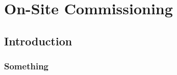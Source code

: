 \chapter{On-Site Commissioning}
\label{chap:commissioning}
\chaptoc{}


\newpage
\section{Introduction}
\label{sec:commissioning_intro}
\begin{colsection}


\begin{colsection}


\end{colsection}

\subsection{Something}
\label{sec:something}
\begin{colsection}


\end{colsection}


\end{colsection}


\newpage
